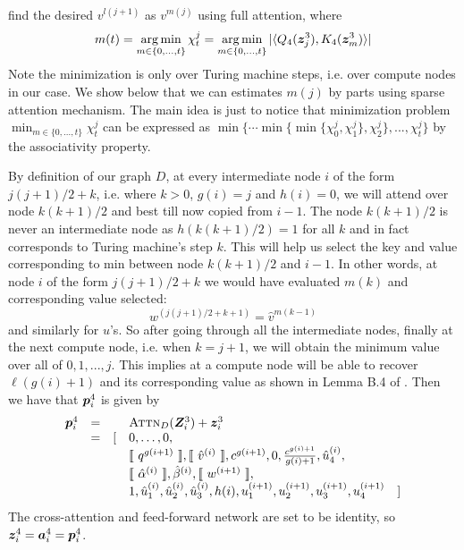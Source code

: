 \citet{Perez19} find the desired $v^{l(j+1)}$ as $v^{m(j)}$ using full attention, where
\begin{equation*}
    m(t) = \operatorname*{arg\,min}_{m\in\{0,...,t\}} \chi_t^j = \operatorname*{arg\,min}_{m\in\{0,...,t\}} | \langle Q_4({\bm{z}}_j^3), K_4({\bm{z}}_m^3) \rangle |
\end{equation*}
Note the minimization is only over Turing machine steps, i.e. over compute nodes in our case.
We show below that we can estimates $m(j)$ by parts using sparse attention mechanism. The main idea is just to notice that minimization problem $\min_{m\in\{0,...,t\}} \chi_t^j$ can be expressed as $\min\{ \cdots \min\{ \min\{\chi^j_0, \chi^j_1\}, \chi^j_2 \}, ..., \chi^j_t \} $ by the associativity property.

By definition of our graph $D$, at every intermediate node $i$ of the form $j(j+1)/2+k$, i.e. where $k>0$, $g(i)=j$ and $h(i)=0$, we will attend over node $k(k+1)/2$ and best till now copied from $i-1$.
The node $k(k+1)/2$ is never an intermediate node as $h(k(k+1)/2)=1$ for all $k$ and in fact corresponds to Turing machine's step $k$.
This will help us select the key and value corresponding to min between node $k(k+1)/2$ and $i-1$.
In other words, at node $i$ of the form $j(j+1)/2+k$ we would have evaluated $m(k)$ and corresponding value selected:
\begin{equation*}
    w^{(j(j+1)/2+k+1)} = \hat{v}^{m(k-1)}
\end{equation*}
and similarly for $u$'s.
So after going through all the intermediate nodes, finally at the next compute node, i.e. when $k=j+1$, we will obtain the minimum value over all of $0,1,...,j$.
This implies at a compute node will be able to recover $\ell(g(i)+1)$ and its corresponding value as shown in Lemma B.4 of \citep{Perez19}.
Then we have that ${\bm{p}}^4_i$ is given by
\begin{equation}
\begin{array}{rcllr}
{\bm{p}}^4_i & = && \textsc{Attn}_D ({\bm{Z}}_i^3) + {\bm{z}}^3_i \\
& = & [ 
& 0,\ldots,0, \\
&&& \llbracket\ q^{g(i+1)}\ \rrbracket,\llbracket\ \hat{v}^{(i)}\ \rrbracket,c^{g(i+1)},0,\frac{c^{g(i)+1}}{g(i)+1},\hat{u}_4^{(i)}, \\
&&& \llbracket\ \hat{\alpha}^{(i)}\ \rrbracket,\hat{\beta}^{(i)},\llbracket\ w^{(i+1)}\ \rrbracket, \\
&&& 1,\hat{u}_1^{(i)},\hat{u}_2^{(i)},\hat{u}_3^{(i)},h(i),{u}_1^{(i+1)},{u}_2^{(i+1)},{u}_3^{(i+1)},{u}_4^{(i+1)} & ] 
\end{array}
\end{equation}
The cross-attention and feed-forward network are set to be identity, so ${\bm{z}}_i^4={\bm{a}}_i^4={\bm{p}}_i^4$.


